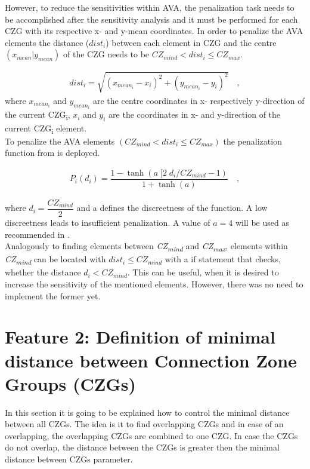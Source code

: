        However, to reduce the sensitivities
       within AVA, the
       penalization task needs to be 
       accomplished after the sensitivity analysis and
       it must be performed 
       for each CZG with its respective x- and y-mean
        coordinates. In order to penalize the AVA 
        elements
		the distance ($dist_i$) between each element in
		 CZG and the centre$(x_{mean}|y_{mean})$ of the CZG needs
		to be $CZ_{mind} < dist_i \leq CZ_{max}$.
		
		\begin{align*}
		dist_i = \sqrt{(x_{mean_i}-x_i)^2+(y_{mean_i}-y_i)^2} \quad,
		\end{align*}
where \textbf{$x_{mean_{i}}$} and\textbf{ $y_{mean_{i}}$} are the centre coordinates 
in x- respectively
y-direction of the current CZG\textsubscript{i},  \textbf{$x_i$ }
and \textbf{$y_i$} are the coordinates in x- and y-direction of the
 current CZG\textsubscript{i} element.\\
 
 To penalize the AVA elements $(CZ_{mind} < dist_i \leq CZ_{max})$ the penalization function from
\cite{Dienemann.2018} is deployed.

\begin{align*}
P_i(d_i) = \dfrac{1- \tanh(a \; [2 \; d_i / CZ_{mind} -1)}{1+ \tanh(a)} \quad,
\end{align*}

where \textbf{$d_i = \dfrac{CZ_{mind}}{2}$}
and a defines the discreetness of the function. A low discreetness leads to
insufficient penalization. A value of $a = 4$ will be used
as recommended in \cite{Dienemann.2018}.\\


Analogously to finding elements between \textit{CZ\textsubscript{mind} }
and \textit{CZ\textsubscript{max}}, elements 
within \textit{CZ\textsubscript{mind}} can be
located with $dist_i \leq  CZ_{mind}$ with
a if statement that checks, whether the distance $d_i < CZ_{mind}$.
This can be useful, when it is desired to increase the sensitivity of
the mentioned elements.
However, there was no need to implement the former yet.

\section{Feature 2: Definition of minimal distance between Connection Zone Groups (CZGs)}
\label{section_dealing_with_overlap}
In this section it is going to be explained how to control
the minimal distance between all CZGs. The idea is it to
find overlapping CZGs and in case of an overlapping, the
overlapping CZGs are combined to one CZG. In
case the CZGs do not overlap, the distance between the
CZGs is greater then the minimal distance between 
CZGs parameter.\\

